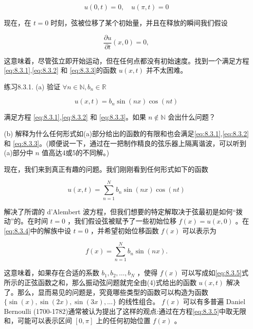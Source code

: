 \begin{equation}
\label{eq:8.3.2}
u\left( {0,t}\right)  = 0, \quad u\left( {\pi ,t}\right)  = 0
\end{equation}

现在，在 \(t = 0\) 时刻，弦被位移了某个初始量，并且在释放的瞬间我们假设

\begin{equation}
\label{eq:8.3.3}
\frac{\partial u}{\partial t}\left( {x,0}\right)  = 0,
\end{equation}


这意味着，尽管弦立即开始运动，但在任何点都没有初始速度。找到一个满足方程\eqref{eq:8.3.1},\eqref{eq:8.3.2} 和 \eqref{eq:8.3.3}的函数 \(u\left( {x,t}\right)\) 并不太困难。

练习8.3.1. (a) 验证 $\forall n \in \mathbb{N}, b_n \in \mathbb{R}$

\[
u\left( {x,t}\right)  = {b}_{n}\sin \left( {nx}\right) \cos \left( {nt}\right)
\]

满足方程 \eqref{eq:8.3.1},\eqref{eq:8.3.2} 和 \eqref{eq:8.3.3}。如果 \(n \notin  \mathbb{N}\) 会出什么问题？

(b) 解释为什么任何形式如(a)部分给出的函数的有限和也会满足\eqref{eq:8.3.1},\eqref{eq:8.3.2} 和 \eqref{eq:8.3.3}。(顺便说一下，通过在一把制作精良的弦乐器上隔离谐波，可以听到(a)部分中 \(n\) 值高达4或5的不同解。)

现在，我们来到真正有趣的问题。我们刚刚看到任何形式如下的函数

\begin{equation}
\label{eq:8.3.4}
u\left( {x,t}\right)  = \mathop{\sum }\limits_{{n = 1}}^{N}{b}_{n}\sin \left( {nx}\right) \cos \left( {nt}\right)
\end{equation}


解决了所谓的 d'Alembert 波方程，但我们想要的特定解取决于弦最初是如何“拨动”的。在时间 \(t = 0\) ，我们假设弦被赋予了一些初始位移 \(f\left( x\right)  = u\left( {x,0}\right)\) 。在\eqref{eq:8.3.4}中的解族中设 \(t = 0\) ，并希望初始位移函数 \(f\left( x\right)\) 可以表示为

\begin{equation}
\label{eq:8.3.5}
f\left( x\right)  = \mathop{\sum }\limits_{{n = 1}}^{N}{b}_{n}\sin \left( {nx}\right) .
\end{equation}

这意味着，如果存在合适的系数 \({b}_{1},{b}_{2},\ldots ,{b}_{N}\) ，使得 \(f\left( x\right)\) 可以写成如\eqref{eq:8.3.5}式所示的正弦函数之和，那么振动弦问题就完全由(4)式给出的函数 \(u\left( {x,t}\right)\) 解决了。那么，显而易见的问题是，究竟哪些类型的函数可以构造为函数 \(\{ \sin \left( x\right) ,\sin \left( {2x}\right) ,\sin \left( {3x}\right) ,\ldots \}\) 的线性组合。 \(f\left( x\right)\) 可以有多普遍 Daniel Bernoulli (1700-1782)通常被认为提出了这样的观点:通过在方程\eqref{eq:8.3.5}中取无限和，可能可以表示区间 \(\left\lbrack  {0,\pi }\right\rbrack\) 上的任何初始位置 \(f\left( x\right)\) 。

